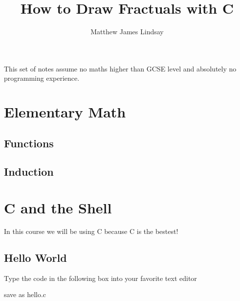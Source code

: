 \documentclass[12pt]{article}
\begin{document}
\begin{titlepage}
    {\centering
        \title{{How to Draw Fractuals with C}\\}
        \author{Matthew James Lindsay}
        \date{}
        }
    \maketitle
\end{titlepage}

\tableofcontents
\clearpage

\setcounter{page}{1}
    This set of notes assume no maths higher than GCSE level
     and absolutely no programming experience. 

\section{Elementary Math}
\subsection{Functions}
\subsection{Induction}

\section{C and the Shell}
    In this course we will be using C because C is the bestest!
\subsection{Hello World}
    Type the code in the following box into your favorite text editor
    
    save as hello.c
    
\end{document}
